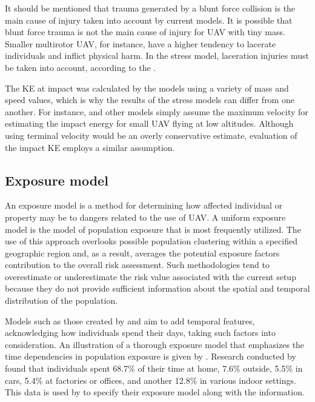 \documentclass[12pt]{report}
\begin{document}
            It should be mentioned that trauma generated by a blunt force collision is the main cause of injury taken
            into account by current models. It is possible that blunt force trauma is not the main cause of injury for
            UAV with tiny mass. Smaller multirotor UAV, for instance, have a higher tendency to lacerate individuals and
            inflict physical harm. In the stress model, laceration injuries must be taken into account, according to the
            \cite{small_aviation_2009}.

            The KE at impact was calculated by the models using a variety of mass and speed values, which is why the
            results of the stress models can differ from one another. For instance, \cite{ancel_real-time_2017} and
            other models simply assume the maximum velocity for estimating the impact energy for small UAV flying at low
            altitudes. Although using terminal velocity would be an overly conservative estimate, \cite{dalamagkidis_evaluating_2008} evaluation of the
            impact KE employs a similar assumption.

        \subsection{Exposure model}
            An exposure model is a method for determining how affected individual or property may be to dangers related
            to the use of UAV.  A uniform exposure model is the model of population exposure that is most frequently
            utilized. The use of this approach overlooks possible population clustering within a specified geographic
            region and, as a result, averages the potential exposure factors contribution to the overall risk
            assessment. Such methodologies tend to overestimate or underestimate the risk value associated with the
            current setup because they do not provide sufficient information about the spatial and temporal distribution
            of the population.

            Models such as those created by \cite{burke_system-level_2011} and \cite{melnyk_third-party_2014} aim to add temporal features, acknowledging how individuals
            spend their days, taking such factors into consideration. An illustration of a thorough exposure model that
            emphasizes the time dependencies in population exposure is given by \cite{melnyk_third-party_2014}. Research conducted by \cite{klepeis_national_2001} found
            that individuals spent 68.7\% of their time at home, 7.6\% outside, 5.5\% in cars, 5.4\% at factories or
            offices, and another 12.8\% in various indoor settings. This data is used by \cite{melnyk_third-party_2014} to specify their exposure
            model along with the information.
\end{document}
